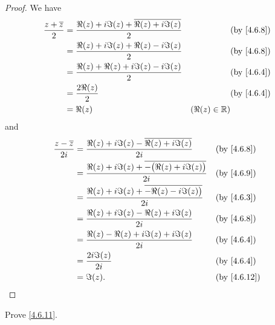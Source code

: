 \begin{proof}
  We have
  \begin{align*}
    \dfrac{z + \overline{z}}{2} & = \dfrac{\Re(z) + i \Im(z) + \overline{\Re(z) + i \Im(z)}}{2} &                 & \text{(by \cref{4.6.8})} \\
                                & = \dfrac{\Re(z) + i \Im(z) + \Re(z) - i \Im(z)}{2}            &                 & \text{(by \cref{4.6.8})} \\
                                & = \dfrac{\Re(z) + \Re(z) + i \Im(z) - i \Im(z)}{2}            &                 & \text{(by \cref{4.6.4})} \\
                                & = \dfrac{2 \Re(z)}{2}                                         &                 & \text{(by \cref{4.6.4})} \\
                                & = \Re(z)                                                      & (\Re(z) \in \R)
  \end{align*}
  and
  \begin{align*}
    \dfrac{z - \overline{z}}{2i} & = \dfrac{\Re(z) + i \Im(z) - \overline{\Re(z) + i \Im(z)}}{2i}            &  & \text{(by \cref{4.6.8})}  \\
                                 & = \dfrac{\Re(z) + i \Im(z) + \overline{-\big(\Re(z) + i \Im(z)\big)}}{2i} &  & \text{(by \cref{4.6.9})}  \\
                                 & = \dfrac{\Re(z) + i \Im(z) + \overline{-\Re(z) - i \Im(z)\big)}}{2i}      &  & \text{(by \cref{4.6.3})}  \\
                                 & = \dfrac{\Re(z) + i \Im(z) - \Re(z) + i \Im(z)}{2i}                       &  & \text{(by \cref{4.6.8})}  \\
                                 & = \dfrac{\Re(z) - \Re(z) + i \Im(z) + i \Im(z)}{2i}                       &  & \text{(by \cref{4.6.4})}  \\
                                 & = \dfrac{2i \Im(z)}{2i}                                                   &  & \text{(by \cref{4.6.4})}  \\
                                 & = \Im(z).                                                                 &  & \text{(by \cref{4.6.12})}
  \end{align*}
\end{proof}

\begin{ex}\label{ex:4.6.6}
  Prove \cref{4.6.11}.
\end{ex}

